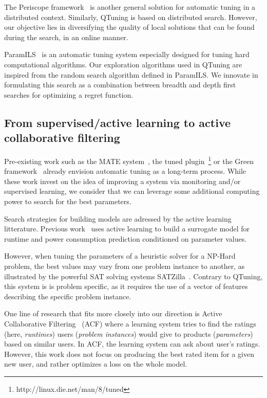\documentclass[10pt, conference, compsocconf]{IEEEtran}
\begin{document}
The Periscope framework~\cite{DBLP:conf/parco/MijakovicSUGSC13} is another
general solution for automatic tuning in a distributed context.
Similarly, QTuning is based on distributed search. However, our objective lies in
diversifying the quality of local solutions that can be found
during the search, in an online manner.

ParamILS~\cite{Hutter:2009:PAA:1734953.1734959} is an automatic tuning system
especially designed for tuning hard computational algorithms. Our
exploration algorithms used in QTuning are inspired from the random search
algorithm defined in ParamILS. We innovate in formulating this search
as a combination between breadth and depth first searches for optimizing a
regret function.

\subsection{From supervised/active learning to active collaborative filtering}

Pre-existing work such as the MATE system~\cite{DBLP:conf/para/MorajkoMCMS10},
the tuned plugin~\footnote{http://linux.die.net/man/8/tuned} or the Green
framework~\cite{Baek:2010:GFS:1809028.1806620} already envision automatic
tuning as a long-term process. While these work invest on the idea of
improving a system via monitoring and/or supervised learning, we consider
that we can leverage some additional computing power to search for the best 
parameters.

Search strategies for building models are adressed by the active
learning~\cite{DBLP:series/synthesis/2012Settles} litterature.  Previous
work~\cite{DBLP:conf/cluster/BalaprakashGW13} uses active learning to build a
surrogate model for runtime and power consumption prediction conditioned on
parameter values.

However, when tuning the parameters of a heuristic solver for a NP-Hard
problem, the best values may vary from one problem instance to another, as
illustrated by the powerful SAT solving systems SATZilla~\cite{xu2008satzilla}.
Contrary to QTuning, this system is is problem specific, as it requires
the use of a vector of features describing the specific problem instance.

One line of research that fits more closely into our direction is Active
Collaborative Filtering~\cite{DBLP:journals/corr/abs-1212-2442} (ACF) where a
learning system tries to find the ratings (here, \textit{runtimes}) users
(\textit{problem instances}) would give to products (\textit{parameters}) based on similar users. In ACF, the
learning system can ask about user's ratings. However, this work does not focus
on producing the best rated item for a given new user, and rather optimizes a
loss on the whole model.
\end{document}
